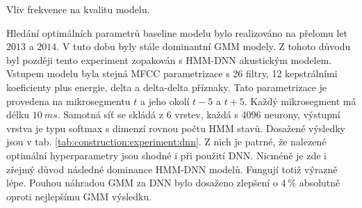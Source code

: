 
\begin{table}[htpb]
  \centering
  \def\arraystretch{1.5}
  \caption{Vliv frekvence na kvalitu modelu.}
  \label{tab:construction:experiment:gmm}
\end{table}

Hledání optimálních parametrů baseline modelu bylo realizováno na přelomu let $2013$ a $2014$. V tuto dobu byly stále dominantní GMM modely. Z tohoto důvodu byl později tento experiment zopakován s HMM-DNN akustickým modelem. Vstupem modelu byla stejná MFCC parametrizace s 26 filtry, 12 kepstrálními koeficienty plus energie, delta a delta-delta příznaky. Tato parametrizace je provedena na mikrosegmentu $t$ a jeho okolí $t-5$ a $t+5$. Každý mikrosegment má délku $10\ ms$. Samotná síť se skládá z 6 vrstev, každá s 4096 neurony, výstupní vrstva je typu softmax s dimenzí rovnou počtu HMM stavů. Dosažené výsledky jsou v tab. \ref{tab:construction:experiment:dnn}. Z nich je patrné, že nalezené optimální hyperparametry jsou shodné i při použití DNN. Nicméně je zde i zřejmý důvod následné dominance HMM-DNN modelů. Fungují totiž výrazně lépe. Pouhou náhradou GMM za DNN bylo dosaženo zlepšení o $4\ \%$ absolutně oproti nejlepšímu GMM výsledku.



